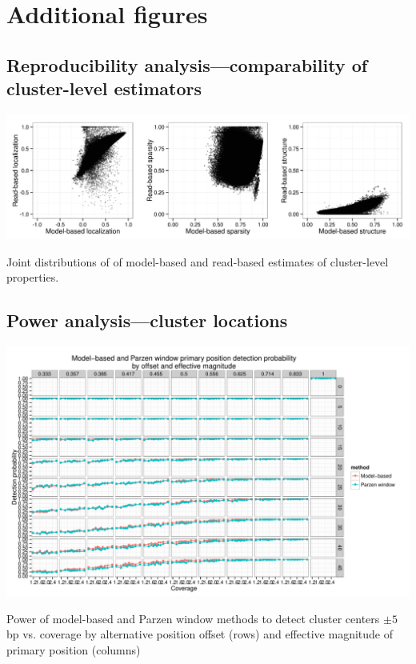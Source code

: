 \section{Additional figures}

\subsection{Reproducibility analysis---comparability of cluster-level estimators}

\begin{FPfigure}
\includegraphics[width=0.95\textheight,angle=90]{figures/nucleosomes/figure_cluster_reproducibility_methods}
\caption{Joint distributions of of model-based and read-based estimates of cluster-level properties. \label{fig:methodComparison}}
\end{FPfigure}
\afterpage{\clearpage}

\subsection{Power analysis---cluster locations}
\label{sec:cluster}

\begin{FPfigure}
\centering
\includegraphics[page=1,width=0.95\textheight,angle=90]{figures/nucleosomes/plots_compare_power}
\caption{Power of model-based and Parzen window methods to detect cluster centers $\pm 5$bp vs. coverage by alternative position offset (rows) and effective magnitude of primary position (columns)}
\end{FPfigure}
\afterpage{\clearpage}

